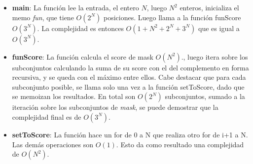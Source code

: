 \begin{itemize}
	\item \textbf{main}: La funci\'on lee la entrada, el entero $N$, luego $N^2$ enteros, inicializa el memo \textit{fun}, que tiene $O(2^N)$ posiciones. Luego llama a la funci\'on funScore $O(3^N)$. La complejidad es entonces $O(1 + N^2 + 2^N + 3^N)$ que es igual a $O(3^N)$.

	\item \textbf{funScore}: La funci\'on calcula el score de mask $O(N^2)$., luego itera sobre los subconjuntos calculando la suma de su score con el del complemento en forma recursiva, y se queda con el m\'aximo entre ellos.
	Cabe destacar que para cada subconjunto posible, se llama solo una vez a la funci\'on setToScore, dado que se memoizan los resultados. En total son $O(2^N)$ subconjuntos, sumado a la iteraci\'on sobre los subconjuntos de \textit{mask}, se puede demostrar que la complejidad final es de $O(3^N)$.

	\item \textbf{setToScore}: La funci\'on hace un for de 0 a N que realiza otro for de i+1 a N. Las dem\'as operaciones son $O(1)$. Esto da como resultado una complejidad de $O(N^2)$.
\end{itemize}
